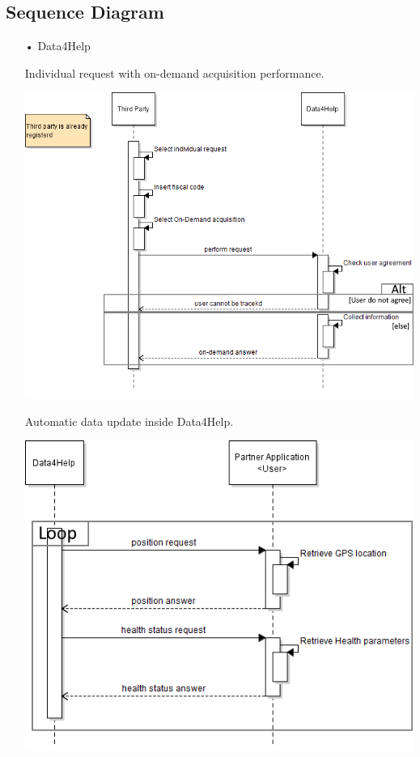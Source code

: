 \subsection{Sequence Diagram}
\begin{enumerate}
\item[•]{\Large Data4Help}

\begin{minipage}{\textwidth}
\FloatBarrier
Individual request with on-demand acquisition performance.
\begin{center}
\includegraphics[scale=0.8]{Images/Seq_Data4Help_onDem.png}
\end{center}
\FloatBarrier

\FloatBarrier
Automatic data update inside Data4Help.
\begin{center}
\includegraphics[scale=0.8]{Images/Seq_Data4Help_autoUp.png}
\end{center}
\FloatBarrier


\end{minipage}
\end{enumerate}
